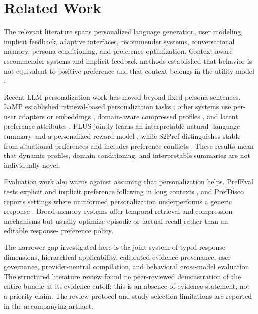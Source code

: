 \section{Related Work}
\label{sec:related}

The relevant literature spans personalized language generation, user modeling,
implicit feedback, adaptive interfaces, recommender systems, conversational
memory, persona conditioning, and preference optimization. Context-aware
recommender systems and implicit-feedback methods established that behavior is
not equivalent to positive preference and that context belongs in the utility
model \citep{hu-etal-2008-collaborative,adomavicius-2011-context-aware}.

Recent LLM personalization work has moved beyond fixed persona sentences. LaMP
established retrieval-based personalization tasks
\citep{salemi-etal-2024-lamp}; other systems use per-user adapters or embeddings
\citep{tan-etal-2024-democratizing,liu-etal-2025-llms}, domain-aware compressed
profiles \citep{su-etal-2025-personalized}, and latent preference attributes
\citep{li-etal-2025-prefpalette}. PLUS jointly learns an interpretable natural-
language summary and a personalized reward model \citep{nam-etal-2026-plus}, while
S2Pref distinguishes stable from situational preferences and includes preference
conflicts \citep{gao-etal-2026-beyond}. These results mean that dynamic profiles,
domain conditioning, and interpretable summaries are not individually novel.

Evaluation work also warns against assuming that personalization helps. PrefEval
tests explicit and implicit preference following in long contexts
\citep{zhao-etal-2025-prefeval}, and PrefDisco reports settings where uninformed
personalization underperforms a generic response \citep{li-etal-2026-prefdisco}.
Broad memory systems offer temporal retrieval and compression mechanisms
\citep{park-etal-2023-generative,packer-etal-2023-memgpt,chhikara-etal-2025-mem0}
but usually optimize episodic or factual recall rather than an editable response-
preference policy.

The narrower gap investigated here is the joint system of typed response
dimensions, hierarchical applicability, calibrated evidence provenance, user
governance, provider-neutral compilation, and behavioral cross-model evaluation.
The structured literature review found no peer-reviewed demonstration of the
entire bundle at its evidence cutoff; this is an absence-of-evidence statement,
not a priority claim. The review protocol and study selection limitations are
reported in the accompanying artifact.
